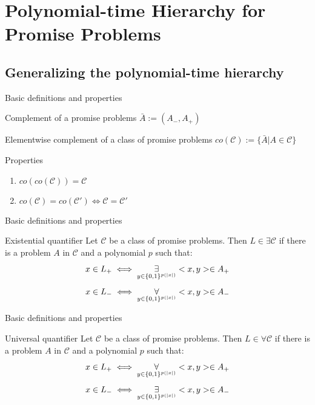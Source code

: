 \section{Polynomial-time Hierarchy for Promise Problems}
    \subsection{Generalizing the polynomial-time hierarchy}
        \begin{frame}{Basic definitions and properties}
            \begin{block}{Complement of a promise problems}
                $\bar{A} := (A_-,A_+)$
            \end{block}
            \pause
            \begin{block}{Elementwise complement of a class of promise problems}
                $co(\mathcal{C}) := \{\bar{A}| A\in \mathcal{C}\}$
            \end{block}
            \pause
            \begin{block}{Properties}
                \begin{enumerate}
                    \item $co(co(\mathcal{C})) = \mathcal{C}$
                    \item $co(\mathcal{C}) = co(\mathcal{C}') \iff \mathcal{C} = \mathcal{C}'$
                \end{enumerate}
            \end{block}
        \end{frame}
        \begin{frame}{Basic definitions and properties}
            \begin{block}{Existential quantifier}
                Let $\mathcal{C}$ be a class of promise problems. Then $L \in \exists \mathcal{C}$ if there is a problem $A$ in $\mathcal{C}$ and a polynomial $p$ such that:
                $$x\in L_+ \iff \overset{{}}{\underset{{y \in \{0,1\}^{p(|x|)}}}{\Large \exists}} <x,y> \in A_+$$
                $$x\in L_- \iff \overset{{}}{\underset{{y \in \{0,1\}^{p(|x|)}}}{\Large \forall}} <x,y> \in A_-$$
            \end{block}
        \end{frame}
        \begin{frame}{Basic definitions and properties}
            \begin{block}{Universal quantifier}
                Let $\mathcal{C}$ be a class of promise problems. Then $L \in \forall \mathcal{C}$ if there is a problem $A$ in $\mathcal{C}$ and a polynomial $p$ such that:
                $$x\in L_+ \iff \overset{{}}{\underset{{y \in \{0,1\}^{p(|x|)}}}{\Large \forall}} <x,y> \in A_+$$
                $$x\in L_- \iff \overset{{}}{\underset{{y \in \{0,1\}^{p(|x|)}}}{\Large \exists}} <x,y> \in A_-$$
            \end{block}
        \end{frame}
